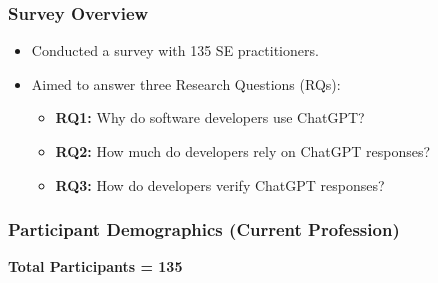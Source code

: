 
\begin{frame}
    \frametitle{Survey Overview}
    \begin{itemize}
        \item Conducted a survey with 135 SE practitioners.
        \item Aimed to answer three Research Questions (RQs):
        \begin{itemize}
            \item \textbf{RQ1:} Why do software developers use ChatGPT?
            \item \textbf{RQ2:} How much do developers rely on ChatGPT responses?
            \item \textbf{RQ3:} How do developers verify ChatGPT responses?
        \end{itemize}
    \end{itemize}
\end{frame}


\begin{frame}
    \frametitle{Participant Demographics (Current Profession)}
    \vspace{0.5cm}
        
        \vspace{1em} %
        \begin{center}
            \textbf{Total Participants = 135}
        \end{center}
\end{frame}



